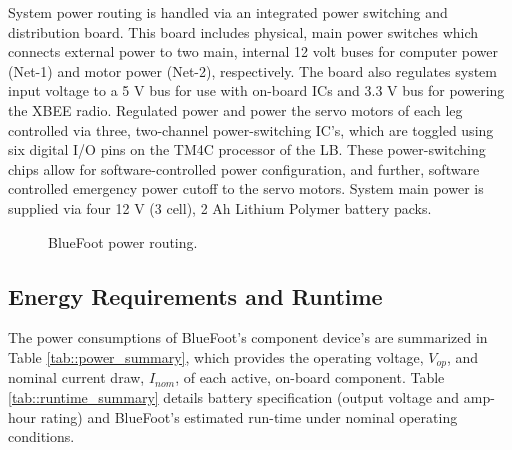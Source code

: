 			System power routing is handled via an integrated power switching and distribution board. This board includes physical, main power switches which connects external power to two main, internal 12 volt buses for  computer power (Net-1) and motor power (Net-2), respectively. The board also regulates system input voltage to a 5 V bus for use with on-board ICs and 3.3 V bus for powering the XBEE radio. Regulated power and power the servo motors of each leg controlled via three, two-channel power-switching IC's, which are toggled using six digital I/O pins on the TM4C processor of the LB. These power-switching chips allow for software-controlled power configuration, and further, software controlled emergency power cutoff to the servo motors. System main power is supplied via four 12 V (3 cell), 2 Ah Lithium Polymer battery packs.
				\begin{figure}[h!]
					\centering
					\caption{BlueFoot power routing.}
					\label{fig::dev_diagram}
				\end{figure}
		
			\subsection{Energy Requirements and Runtime}

			
			The power consumptions of BlueFoot's component device's are summarized in Table \ref{tab::power_summary}, which provides the operating voltage, $V_{op}$, and nominal current draw, $I_{nom}$, of each active, on-board component. Table \ref{tab::runtime_summary} details battery specification (output voltage and amp-hour rating) and BlueFoot's estimated run-time under nominal operating conditions.
		
